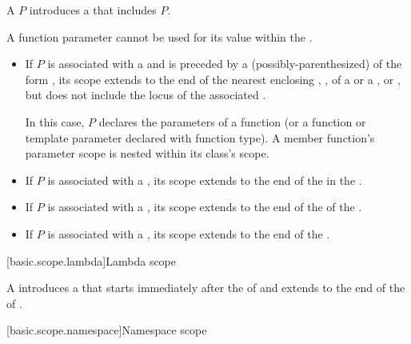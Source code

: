 %
%

\pnum
A  $P$ introduces
a  that includes $P$.
\begin{note}
A function parameter cannot be used for its value
within the .
\end{note}
\begin{itemize}
\item
If $P$ is associated with a  and
is preceded by a (possibly-parenthesized)  of
the form
 ,
its scope extends to the end of the nearest enclosing
,
,
 of a  or
a , or
,
but does not include the locus of the associated .
\begin{note}
In this case, $P$ declares the parameters of a function
(or a function or template parameter declared with function type).
A member function's parameter scope is nested within its class's scope.
\end{note}
\item
If $P$ is associated with a ,
its scope extends to the end of the 
in the .
\item
If $P$ is associated with a ,
its scope extends to the end of the  of the .
\item
If $P$ is associated with a ,
its scope extends to the end of the .
\end{itemize}

[basic.scope.lambda]{Lambda scope}

A   introduces a 
that starts immediately after the  of 
and extends to the end of the  of .

[basic.scope.namespace]{Namespace scope}

